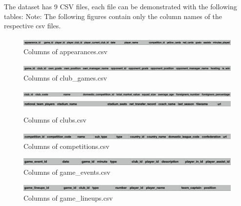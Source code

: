 \documentclass{Configuration_Files/PoliMi3i_thesis}
\begin{document}
The dataset has 9 CSV files, each file can be demonstrated with the following tables: \newline
\footnotesize{Note: The following figures contain only the column names of the respective csv files.}

\begin{figure}[H]
    \centering
    \includegraphics[width=1\linewidth]{Project Template/Images/appearances.png}
    \caption{Columns of appearances.csv}
\end{figure}

\begin{figure}[H]
    \centering
    \includegraphics[width=1\linewidth]{Project Template/Images/club_games.png}
    \caption{Columns of club\_games.csv}
\end{figure}

\begin{figure}[H]
    \centering
    \includegraphics[width=1\linewidth]{Project Template/Images/clubs1.png}
    \includegraphics[width=1\linewidth]{Project Template/Images/clubs2.png}
\caption{Columns of clubs.csv}
\end{figure}

\begin{figure}[H]
    \centering
    \includegraphics[width=1\linewidth]{Project Template/Images/competitions.png}
\caption{Columns of competitions.csv}
\end{figure}

\begin{figure}[H]
    \centering
    \includegraphics[width=1\linewidth]{Project Template/Images/game_events.png}
\caption{Columns of game\_events.csv}
\end{figure}

\begin{figure}[H]
    \centering
    \includegraphics[width=1\linewidth]{Project Template/Images/lineups.png}
\caption{Columns of game\_lineups.csv}
\end{figure}
\end{document}
